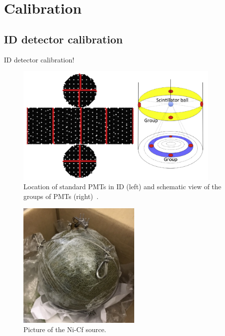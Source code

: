
%
%

\section{Calibration}\label{Section_Calibration}

\subsection{ID detector calibration}
\vs\hs ID detector calibration!

\begin{figure}[tbp]
	\centering
	\includegraphics[width=10cm]{Figures/Calibration/CalibPMT}
	\caption[Location of standard PMTs in ID and schematic view of the groups of PMTs]{\label{Calibration_CalibPMT} Location of standard PMTs in ID (left) and schematic view of the groups of PMTs (right)~\cite{2014AbeCalib}.}
\end{figure}

\begin{figure}[tbp]
	\centering
	\includegraphics[width=6cm]{Figures/Calibration/Ni}
	\caption[Picture of the Ni-Cf source]{\label{Calibration_Ni} Picture of the Ni-Cf source.}
\end{figure}

